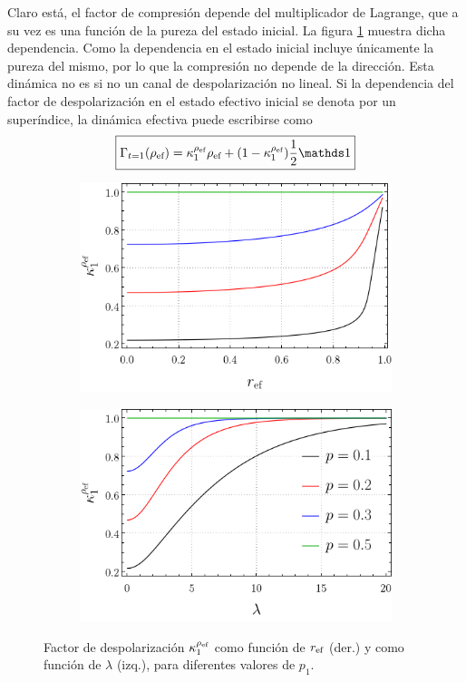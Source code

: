 Claro está, el factor de compresión depende del multiplicador de Lagrange, que a su vez es una función de la pureza del estado inicial. La figura \ref{fig:SWAPFactor2Drl} muestra dicha dependencia. Como la dependencia en el estado inicial incluye únicamente la pureza del mismo, por lo que la compresión no depende de la dirección. Esta dinámica no es si no un canal de despolarización no lineal. Si la dependencia del factor de despolarización en el estado efectivo inicial se denota por un superíndice, la dinámica efectiva puede escribirse como
\begin{equation}\label{eq:EffectiveSWAP1}
  \boxed{\Gamma_{t=1}(\rho_{\ef})=\kappa_{1}^{\rho_{\ef}}\rho_{\ef}+(1-\kappa_{1}^{\rho_{\ef}})\frac{1}{2}\Id}
\end{equation}
\begin{figure}[ht!]
  \centering
  \begin{subfigure}{0.5\textwidth}
    \centering
    \includegraphics[width=0.9\linewidth]{chapter3/figures_toy/K(r).png}
  \end{subfigure}%
  \begin{subfigure}{0.5\textwidth}
    \centering
    \includegraphics[width=0.9\linewidth]{chapter3/figures_toy/K(lambda).png}
  \end{subfigure}
  \caption{Factor de despolarización $\kappa_{1}^{\rho_{\text{ef}}}$ como función de $r_{\text{ef}}$ (der.) y como función de $\lambda$ (izq.), para diferentes valores de $p_{1}$.}\label{fig:SWAPFactor2Drl}
\end{figure}


